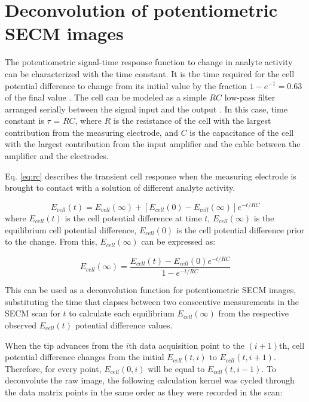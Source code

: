 	\section{Deconvolution of potentiometric SECM images}
The potentiometric signal-time response function to change in analyte activity can be characterized with the time constant.
It is the time required for the cell potential difference to change from its initial value by the fraction $1-e^{-1} = 0.63$ of the final value \cite{mcnaught1997compendium}.
The cell can be modeled as a simple $RC$ low-pass filter arranged serially between the signal input and the output \cite{halliwell1987using}.
In this case, time constant is $\tau$ = $RC$, where $R$ is the resistance of the cell with the largest contribution from the measuring electrode, and $C$ is the capacitance of the cell with the largest contribution from the input amplifier and the cable between the amplifier and the electrodes.

Eq. \ref{eq:rc} describes the transient cell response when the measuring electrode is brought to contact with a solution of different analyte activity.

\begin{equation}
\label{eq:rc}
        E_{cell}(t) = E_{cell}(\infty) + [E_{cell}(0) - E_{cell}(\infty)]e^{-t/RC}
\end{equation}
where $E_{cell}(t)$ is the cell potential difference at time $t$, $E_{cell}(\infty)$ is the equilibrium cell potential difference, $E_{cell}(0)$ is the cell potential difference prior to the change. From this, $E_{cell}(\infty)$ can be expressed as:

\begin{equation}
\label{eq:rc2}
        E_{cell}(\infty)
        =
        \frac
                {E_{cell}(t) - E_{cell}(0)e^{-t/RC}}
                {1 - e^{-t/RC}}
\end{equation}

This can be used as a deconvolution function for potentiometric SECM images, substituting the time that elapses between two consecutive measurements in the SECM scan for $t$ to calculate each equilibrium $E_{cell}(\infty)$ from the respective observed $E_{cell}(t)$ potential difference values.

When the tip advances from the $i$th data acquisition point to the $(i+1)$th, cell potential difference changes from the initial $E_{cell}(t, i)$ to $E_{cell}(t, i+1)$.
Therefore, for every point, $E_{cell}(0, i)$ will be equal to $E_{cell}(t, i-1)$.
To deconvolute the raw image, the following calculation kernel was cycled through the data matrix points in the same order as they were recorded in the scan:


